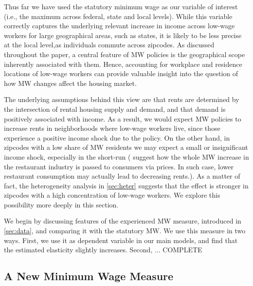 
Thus far we have used the statutory minimum wage as our variable of interest (i.e., 
the maximum across federal, state and local levels). While this variable correctly 
captures the underlying relevant increase in income across low-wage workers for large
geographical areas, such as states, it is likely to be less precise at the local level,as 
individuals commute across zipcodes. As discussed throughout the paper, a central feature of MW 
policies is the geographical scope inherently associated with them. Hence, accounting 
for workplace and residence locations of low-wage workers can provide valuable insight 
into the question of how MW changes affect the housing market. 

The underlying assumptions behind this view are that rents are determined by the 
intersection of rental housing supply and demand, and that demand is
positively associated with income. As a result, we would expect MW policies to increase 
rents in neighborhoods where low-wage workers live, since those experience a positive
income shock due to the policy. On the other hand,  in zipcodes with a low share 
of MW residents we may expect a small or insignificant income shock, especially 
in the short-run (\cite{allegretto2018local} suggest how the whole MW increase in 
the restaurant industry is passed to consumers via prices. In such case, lower 
restaurant consumption may actually lead to decreasing rents.). 
As a matter of fact, the heterogeneity analysis in 
\autoref{sec:heter} suggests that the effect is stronger in zipcodes with a high
concentration of low-wage workers. We explore this possibility more deeply in this 
section.

We begin by discussing features of the experienced MW measure, 
introduced in \autoref{sec:data}, and comparing it with the statutory MW. 
We use this measure in two ways. First, we use it as dependent variable in our main models, 
and find that the estimated elasticity slightly increases. Second, ... COMPLETE

\subsection{A New Minimum Wage Measure}

